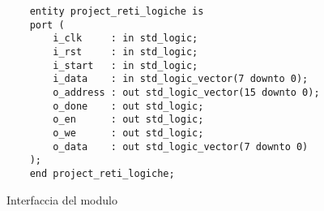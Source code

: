 \begin{figure}[!ht]
    \centering
    \begin{varwidth}{\linewidth}
        \begin{verbatim}
    entity project_reti_logiche is
    port (
        i_clk     : in std_logic;
        i_rst     : in std_logic;
        i_start   : in std_logic;
        i_data    : in std_logic_vector(7 downto 0);
        o_address : out std_logic_vector(15 downto 0);
        o_done    : out std_logic;
        o_en      : out std_logic;
        o_we      : out std_logic;
        o_data    : out std_logic_vector(7 downto 0)
    );
    end project_reti_logiche;
    \end{verbatim}
    \end{varwidth}
    \caption{Interfaccia del modulo}
    \label{code:interfacciacomponente}
\end{figure}